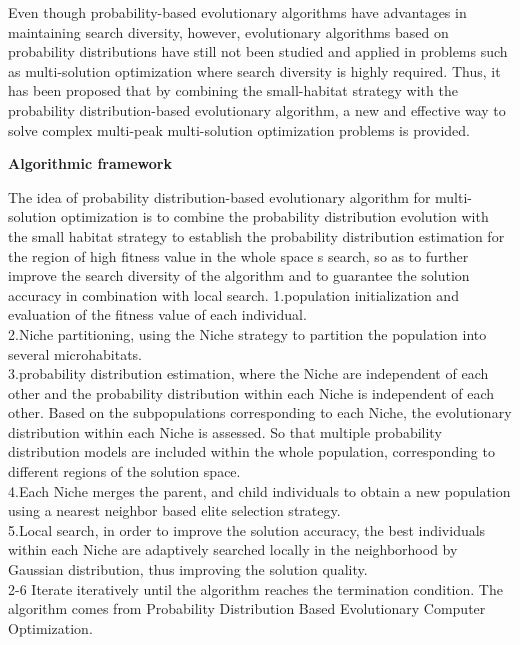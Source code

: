\documentclass[twocolumn]{article}
\begin{document}
Even though probability-based evolutionary algorithms have advantages in
maintaining search diversity, however, evolutionary algorithms based on
probability distributions have still not been studied and applied in
problems such as multi-solution optimization where search diversity is
highly required. Thus, it has been proposed that by combining the
small-habitat strategy with the probability distribution-based
evolutionary algorithm, a new and effective way to solve complex
multi-peak multi-solution optimization problems is provided.

\textbf{Algorithmic framework}

The idea of probability distribution-based evolutionary algorithm for
multi-solution optimization is to combine the probability distribution
evolution with the small habitat strategy to establish the probability
distribution estimation for the region of high fitness value in the
whole space s search, so as to further improve the search diversity of
the algorithm and to guarantee the solution accuracy in combination with
local search.
	1.population initialization and evaluation of the fitness value of each
	individual.\\
	2.Niche partitioning, using the Niche strategy to partition the
	population into several microhabitats.\\
	3.probability distribution estimation, where the Niche are independent
	of each other and the probability distribution within each Niche is
	independent of each other. Based on the subpopulations corresponding
	to each Niche, the evolutionary distribution within each Niche is
	assessed. So that multiple probability distribution models are
	included within the whole population, corresponding to different
	regions of the solution space.\\
	4.Each Niche merges the parent, and child individuals to obtain a new
	population using a nearest neighbor based elite selection strategy.\\
	5.Local search, in order to improve the solution accuracy, the best
	individuals within each Niche are adaptively searched locally in the
	neighborhood by Gaussian distribution, thus improving the solution
	quality.\\
2-6 Iterate iteratively until the algorithm reaches the termination
condition. The algorithm comes from Probability Distribution Based Evolutionary Computer Optimization.
\end{document}
